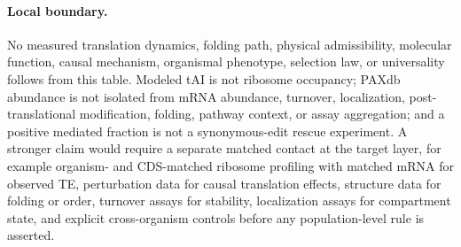 \paragraph{Local boundary.}
No measured translation dynamics, folding path, physical admissibility, molecular function, causal mechanism, organismal phenotype, selection law, or universality follows from this table.  Modeled tAI is not ribosome occupancy; PAXdb abundance is not isolated from mRNA abundance, turnover, localization, post-translational modification, folding, pathway context, or assay aggregation; and a positive mediated fraction is not a synonymous-edit rescue experiment.  A stronger claim would require a separate matched contact at the target layer, for example organism- and CDS-matched ribosome profiling with matched mRNA for observed TE, perturbation data for causal translation effects, structure data for folding or order, turnover assays for stability, localization assays for compartment state, and explicit cross-organism controls before any population-level rule is asserted.
